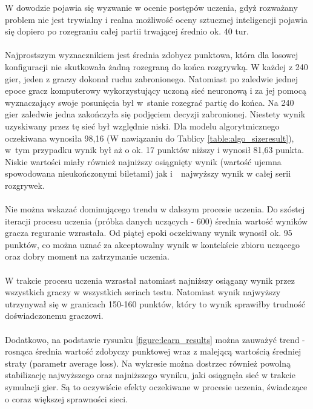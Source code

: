 \documentclass[12pt, oneside]{report}
\begin{document}
	W dowodzie pojawia się wyzwanie w ocenie postępów uczenia, gdyż rozważany problem nie jest trywialny i realna możliwość oceny sztucznej inteligencji pojawia się dopiero po rozegraniu całej partii trwającej średnio ok. 40 tur. \\ \\
	Najprostszym wyznacznikiem jest średnia zdobycz punktowa, która dla losowej konfiguracji nie skutkowała żadną rozegraną do końca rozgrywką. W każdej z 240 gier, jeden z graczy dokonał ruchu zabronionego. Natomiast po zaledwie jednej epoce gracz komputerowy wykorzystujący uczoną sieć neuronową i za jej pomocą wyznaczający swoje posunięcia był w~stanie rozegrać partię do końca. Na 240 gier zaledwie jedna zakończyła się podjęciem decyzji zabronionej. Niestety wynik uzyskiwany przez tę sieć był względnie niski. Dla modelu algorytmicznego oczekiwana wynosiła 98,16 (W nawiązaniu do Tablicy \ref{table:algo_sizeresult}), w~tym przypadku wynik był aż o ok. 17 punktów niższy i wynosił 81,63 punkta. Niskie wartości miały również najniższy osiągnięty wynik (wartość ujemna spowodowana nieukończonymi biletami) jak i~~najwyższy wynik w całej serii rozgrywek. \\ \\
	Nie można wskazać dominującego trendu w dalszym procesie uczenia. Do szóstej iteracji procesu uczenia (próbka danych uczących - 600) średnia wartość wyników gracza reguranie wzrastała. Od piątej epoki oczekiwany wynik wynosił ok. 95 punktów, co można uznać za akceptowalny wynik w kontekście zbioru uczącego oraz dobry moment na zatrzymanie uczenia.
	\\ \\ W trakcie procesu uczenia wzrastał natomiast najniższy osiągany wynik przez wszystkich graczy w wszystkich seriach testu. Natomiast wynik najwyższy utrzynywał się w granicach 150-160 punktów, który to wynik sprawiłby trudność doświadczonemu graczowi. \\ \\
	Dodatkowo, na podstawie rysunku \ref{figure:learn_results} można zauważyć trend - rosnąca średnia wartość zdobyczy punktowej wraz z malejącą wartością średniej straty (parametr average loss). Na wykresie można dostrzec również powolną stabilizację najwyższego oraz najniższego wyniku, jaki osiągnęła sieć w trakcie symulacji gier. Są to oczywiście efekty oczekiwane w procesie uczenia, świadczące o coraz większej sprawności sieci.
\end{document}
